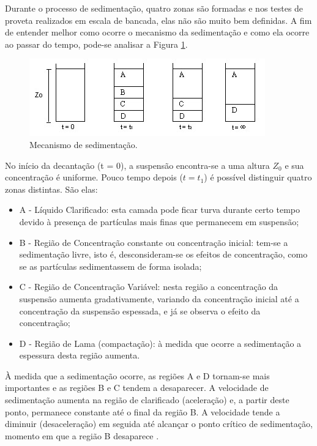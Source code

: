 Durante o processo de sedimentação, quatro zonas são formadas e nos testes de proveta realizados em escala de bancada, elas não são muito bem definidas. A fim de entender melhor como ocorre o mecanismo da sedimentação e como ela ocorre ao passar do tempo, pode-se analisar a Figura \ref{etapasprov}.


\begin{figure}[H]
	\begin{center}
		\includegraphics[scale=.8, trim={0 0 0 0}]{figuras/ladeq/sedi/proveta}
		\caption{Mecanismo de sedimentação.}
		\label{etapasprov}
	\end{center}
\end{figure}


No início da decantação (t = 0), a suspensão encontra-se a uma altura $ Z_{0} $ e sua concentração é uniforme. Pouco tempo depois ($t = t_{1} $) é possível distinguir quatro zonas distintas. São elas:


\begin{itemize}
\item A - Líquido Clarificado: esta camada pode ficar turva durante certo tempo devido à presença de partículas mais finas que permanecem em suspensão;
\item B - Região de Concentração constante ou concentração inicial: tem-se a sedimentação livre, isto é, desconsideram-se os efeitos de concentração, como se as partículas sedimentassem de forma isolada;
\item C - Região de Concentração Variável: nesta região a concentração da suspensão aumenta gradativamente, variando da concentração inicial até a concentração da suspensão espessada, e já se observa o efeito da concentração;
\item D - Região de Lama (compactação): à medida que ocorre a sedimentação a espessura desta região aumenta. 
\end{itemize}

À medida que a sedimentação ocorre, as regiões A e D tornam-se mais importantes e as regiões B e C tendem a desaparecer. 
A velocidade de sedimentação aumenta na região de clarificado (aceleração) e, a partir deste ponto, permanece constante até o final da região B. A velocidade tende a diminuir (desaceleração) em seguida até alcançar o ponto crítico de sedimentação, momento em que a região B desaparece \citep{macabe}.

